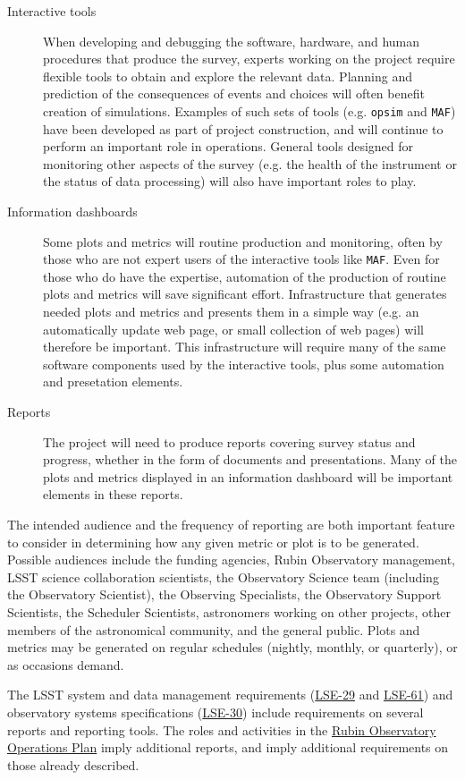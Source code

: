 \begin{description}
\item[{Interactive tools}] When developing and debugging the software, hardware, and human procedures that produce the survey, experts working on the project require flexible tools to obtain and explore the relevant data. Planning and prediction of the consequences of events and choices will often benefit creation of simulations. Examples of such sets of tools (e.g. \texttt{opsim} and \texttt{MAF}) have been developed as part of project construction, and will continue to perform an important role in operations. General tools designed for monitoring other aspects of the survey (e.g. the health of the instrument or the status of data processing) will also have important roles to play.
\item[{Information dashboards}] Some plots and metrics will routine production and monitoring, often by those who are not expert users of the interactive tools like \texttt{MAF}. Even for those who do have the expertise, automation of the production of routine plots and metrics will save significant effort. Infrastructure that generates needed plots and metrics and presents them in a simple way (e.g. an automatically update web page, or small collection of web pages) will therefore be important. This infrastructure will require many of the same software components used by the interactive tools, plus some automation and presetation elements.
\item[{Reports}] The project will need to produce reports covering survey status and progress, whether in the form of documents and presentations. Many of the plots and metrics displayed in an information dashboard will be important elements in these reports.
\end{description}

The intended audience and the frequency of reporting are both important feature to consider in determining how any given metric or plot is to be generated.
Possible audiences include the funding agencies, Rubin Observatory management, LSST science collaboration scientists, the Observatory Science team (including the Observatory Scientist), the Observing Specialists, the Observatory Support Scientists, the Scheduler Scientists, astronomers working on other projects, other members of the astronomical community, and the general public. 
Plots and metrics may be generated on regular schedules (nightly, monthly, or quarterly), or as occasions demand.

The LSST system and data management requirements (\href{https://ls.st/lse-29}{LSE-29} and \href{https://ls.st/lse-61}{LSE-61}) and observatory systems specifications (\href{https://ls.st/lse-30}{LSE-30}) include requirements on several reports and reporting tools. The roles and activities in the \href{https://docushare.lsst.org/docushare/dsweb/Get/Document-36797/Rubin\%20Observatory\%20Operations\%20Plan\%20April\%202020.pdf}{Rubin Observatory Operations Plan} imply additional reports, and imply additional requirements on those already described.

